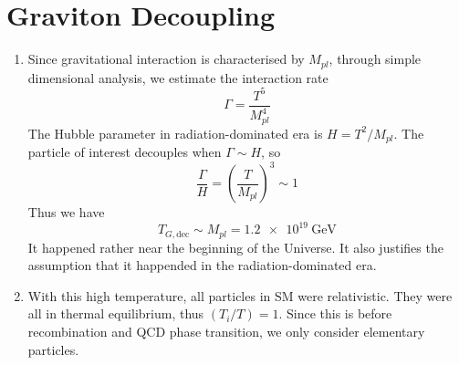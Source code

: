 \section{Graviton Decoupling}
\begin{enumerate}[label=\alph*)]
   \item Since gravitational interaction is characterised by $M_{pl}$, through simple dimensional analysis, we estimate the interaction rate
      \begin{equation}
         \Gamma = \frac{T^5}{M_{pl}^4}
      \end{equation}
      The Hubble parameter in radiation-dominated era is $H = T^{2}/M_{pl}$. The particle of interest decouples when $\Gamma \sim H$, so
      \begin{equation*}
         \frac{\Gamma}{H} = \left( \frac{T}{M_{pl}} \right)^3 \sim 1 
      \end{equation*}
      Thus we have
      \begin{equation}
         T_{G,\text{dec}} \sim M_{pl} = \SI{1.2e19}{\giga\eV}
      \end{equation}
      It happened rather near the beginning of the Universe. It also justifies the assumption that it happended in the radiation-dominated era.

   \item With this high temperature, all particles in SM were relativistic. They were all in thermal equilibrium, thus $(T_i/T) = 1$. Since this is before recombination and QCD phase transition, we only consider elementary particles. 


\end{enumerate}
